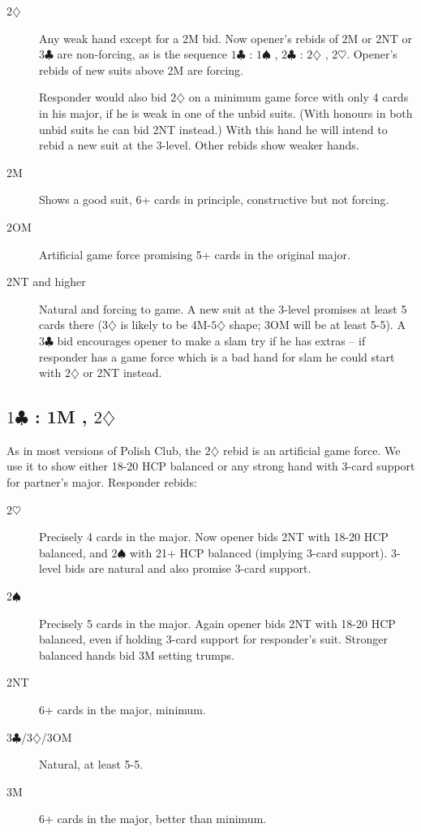 \documentclass{article}
\newcommand{\sz}{\spadesuit}
\newcommand{\hz}{\heartsuit}
\newcommand{\dz}{\diamondsuit}
\newcommand{\cz}{\clubsuit}
\begin{document}
\begin{description}
\item[2$\dz$] Any weak hand except for a 2M bid. Now opener's rebids of 2M or 2NT or $3\cz$ are non-forcing, as is the sequence $1\cz$ : $1\sz$ , $2\cz$ : $2\dz$ , $2\hz$. Opener's rebids of new suits above 2M are forcing.

Responder would also bid $2\dz$ on a minimum game force with only 4 cards in his major, if he is weak in one of the unbid suits. (With honours in both unbid suits he can bid 2NT instead.) With this hand he will intend to rebid a new suit at the 3-level. Other rebids show weaker hands.
\item[2M] Shows a good suit, 6+ cards in principle, constructive but not forcing.
\item[2OM] Artificial game force promising 5+ cards in the original major.
\item[2NT and higher] Natural and forcing to game. A new suit at the 3-level promises at least 5 cards there ($3\dz$ is likely to be 4M-$5\dz$ shape; 3OM will be at least 5-5). A $3\cz$ bid encourages opener to make a slam try if he has extras -- if responder has a game force which is a bad hand for slam he could start with $2\dz$ or 2NT instead.
\end{description}

\subsection{$1\cz$ : 1M , $2\dz$}

As in most versions of Polish Club, the $2\dz$ rebid is an artificial game force. We use it to show either 18-20 HCP balanced or any strong hand with 3-card support for partner's major. Responder rebids:

\begin{description}
\item[2$\hz$] Precisely 4 cards in the major. Now opener bids 2NT with 18-20 HCP balanced, and $2\sz$ with 21+ HCP balanced (implying 3-card support). 3-level bids are natural and also promise 3-card support.
\item[2$\sz$] Precisely 5 cards in the major. Again opener bids 2NT with 18-20 HCP balanced, even if holding 3-card support for responder's suit. Stronger balanced hands bid 3M setting trumps.
\item[2NT] 6+ cards in the major, minimum.
\item[3$\cz$/3$\dz$/3OM] Natural, at least 5-5.
\item[3M] 6+ cards in the major, better than minimum.
\end{description}
\end{document}
